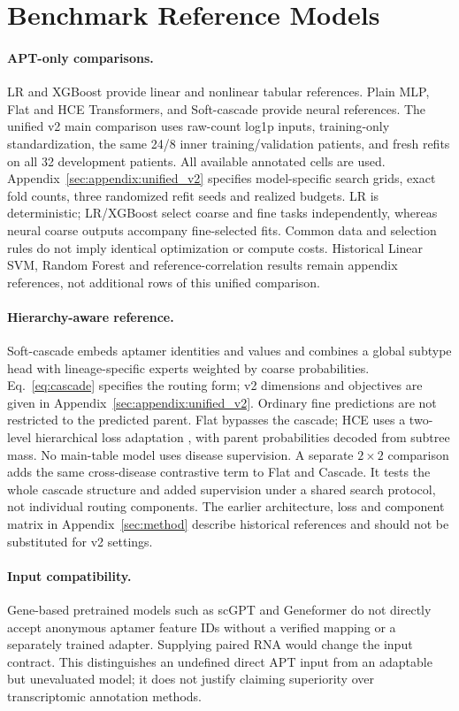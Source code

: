 \section{Benchmark Reference Models}
\label{sec:method_summary}

\paragraph{APT-only comparisons.}
LR and XGBoost provide linear and nonlinear tabular references. Plain MLP,
Flat and HCE Transformers, and Soft-cascade provide neural references.
The unified v2 main comparison uses raw-count log1p inputs, training-only
standardization, the same 24/8 inner training/validation patients, and fresh
refits on all 32 development patients. All available annotated cells are used.
Appendix~\ref{sec:appendix:unified_v2} specifies model-specific search grids,
exact fold counts, three randomized refit seeds and realized budgets.
LR is deterministic; LR/XGBoost select coarse and fine tasks independently,
whereas neural coarse outputs accompany fine-selected fits. Common data and
selection rules do not imply identical optimization or compute costs.
Historical Linear SVM, Random Forest and reference-correlation results remain
appendix references, not additional rows of this unified comparison.

\paragraph{Hierarchy-aware reference.}
Soft-cascade embeds aptamer identities and values and combines a global
subtype head with lineage-specific experts weighted by coarse probabilities.
Eq.~\ref{eq:cascade} specifies the routing form; v2 dimensions and objectives
are given in Appendix~\ref{sec:appendix:unified_v2}. Ordinary fine predictions
are not restricted to the predicted parent. Flat bypasses the cascade;
HCE uses a two-level hierarchical loss adaptation
\citep{cultrera2026improving}, with parent probabilities decoded from subtree
mass. No main-table model uses disease supervision. A separate $2\times2$
comparison adds the same cross-disease contrastive term to Flat and Cascade.
It tests the whole cascade structure and added supervision under a shared
search protocol, not individual routing components. The earlier architecture,
loss and component matrix in Appendix~\ref{sec:method} describe historical
references and should not be substituted for v2 settings.

\paragraph{Input compatibility.}
Gene-based pretrained models such as scGPT and Geneformer
\citep{cui2024scgpt,theodoris2023transfer} do not directly accept anonymous
aptamer feature IDs without a verified mapping or a separately trained adapter.
Supplying paired RNA would change the input contract. This distinguishes an
undefined direct APT input from an adaptable but unevaluated model; it does
not justify claiming superiority over transcriptomic annotation methods.

